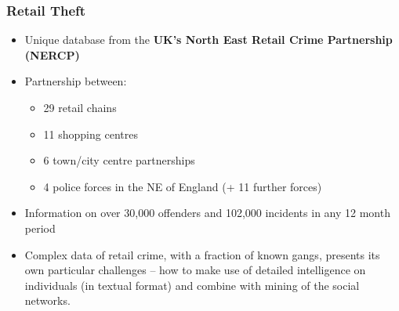 \documentclass[pdftex]{beamer}
\begin{document}
\begin{frame}
\frametitle{Retail Theft}
\begin{itemize}
\item Unique database from the {\textbf{UK's North East Retail Crime Partnership (NERCP)}}
\item Partnership between:
\begin{itemize}
\item 29 retail chains
\item 11 shopping centres
\item 6 town/city centre partnerships
\item 4 police forces in the NE of England (+ 11 further forces)
\end{itemize}
\item Information on over 30,000 offenders and 102,000 incidents in
  any 12 month period
\item Complex data of retail crime, with a fraction of known
  gangs, presents its own particular challenges -- how to make use of
  detailed intelligence on individuals (in textual format) and
  combine with mining of the social networks.
\end{itemize}
\end{frame}



\end{document}
